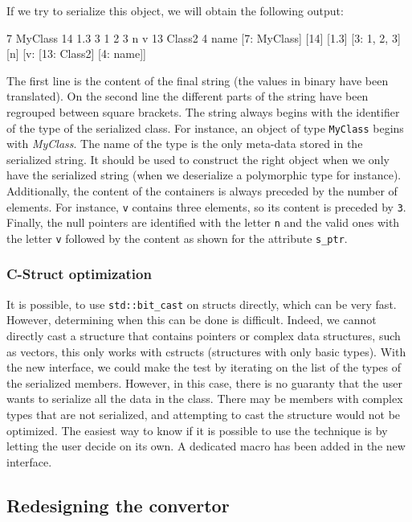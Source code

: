 If we try to serialize this object, we will obtain the following output:

\begin{format}
  7 MyClass 14 1.3 3 1 2 3 n v 13 Class2 4 name
  [7: MyClass] [14] [1.3] [3: 1, 2, 3] [n] [v: [13: Class2] [4: name]]
\end{format}\leavevmode\newline

The first line is the content of the final string (the values in binary have
been translated). On the second line the different parts of the string have been
regrouped between square brackets. The string always begins with the identifier
of the type of the serialized class. For instance, an object of type
\texttt{MyClass} begins with \textit{MyClass}. The name of the type is the only
meta-data stored in the serialized string. It should be used to construct the
right object when we only have the serialized string (when we deserialize a
polymorphic type for instance). Additionally, the content of the containers is
always preceded by the number of elements. For instance, \texttt{v} contains
three elements, so its content is preceded by \texttt{3}. Finally, the null
pointers are identified with the letter \texttt{n} and the valid ones with the
letter \texttt{v} followed by the content as shown for the attribute
\texttt{s\_ptr}.

\subsubsection{C-Struct optimization}

It is possible, to use \texttt{std::bit\_cast} on structs directly, which can be
very fast. However, determining when this can be done is difficult. Indeed, we
cannot directly cast a structure that contains pointers or complex data
structures, such as vectors, this only works with \glspl{cstruct} (structures
with only basic types). With the new interface, we could make the test by
iterating on the list of the types of the serialized members. However, in this
case, there is no guaranty that the user wants to serialize all the data in the
class. There may be members with complex types that are not serialized, and
attempting to cast the structure would not be optimized. The easiest way to know
if it is possible to use the technique is by letting the user decide on its own.
A dedicated macro has been added in the new interface.

\subsection{Redesigning the convertor}
\label{sec:convertor}

